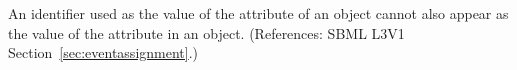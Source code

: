 An identifier used as the value of the  attribute of an
\EventAssignment object cannot also appear as the value of the
 attribute in an \AssignmentRule object.  (References: SBML
L3V1 Section~\ref{sec:eventassignment}.)

